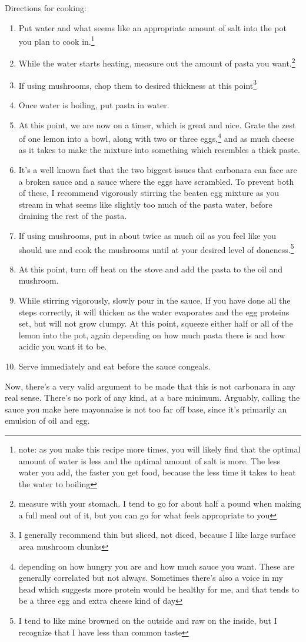 \documentclass[12pt]{article}[titlepage]
\newcommand{\1}{\={a}}
\newcommand{\2}{\={e}}
\newcommand{\3}{\={\i}}
\newcommand{\4}{\=o}
\newcommand{\5}{\=u}
\newcommand{\6}{\={A}}
\renewcommand{\,}{\textsuperscript{,}}
\begin{document}
Directions for cooking:
\begin{enumerate}
\item Put water and what seems like an appropriate amount of salt into the pot you plan to cook in.\footnote{note: as you make this recipe more times, you will likely find that the optimal amount of water is less and the optimal amount of salt is more.
The less water you add, the faster you get food, because the less time it takes to heat the water to boiling}
\item While the water starts heating, measure out the amount of pasta you want.\footnote{measure with your stomach.
I tend to go for about half a pound when making a full meal out of it, but you can go for what feels appropriate to you}
\item If using mushrooms, chop them to desired thickness at this point\footnote{I generally recommend thin but sliced, not diced, because I like large surface area mushroom chunks}
\item Once water is boiling, put pasta in water.
\item At this point, we are now on a timer, which is great and nice.
Grate the zest of one lemon into a bowl, along with two or three eggs,\footnote{depending on how hungry you are and how much sauce you want.
These are generally correlated but not always.
Sometimes there's also a voice in my head which suggests more protein would be healthy for me, and that tends to be a three egg and extra cheese kind of day}
and as much cheese as it takes to make the mixture into something which resembles a thick paste.
\item It's a well known fact that the two biggest issues that carbonara can face are a broken sauce and a sauce where the eggs have scrambled.
To prevent both of these, I recommend vigorously stirring the beaten egg mixture as you stream in what seems like slightly too much of the pasta water, before draining the rest of the pasta.
\item If using mushrooms, put in about twice as much oil as you feel like you should use and cook the mushrooms until at your desired level of doneness.\footnote{I tend to like mine browned on the outside and raw on the inside, but I recognize that I have less than common taste}
\item At this point, turn off heat on the stove and add the pasta to the oil and mushroom.
\item While stirring vigorously, slowly pour in the sauce.
If you have done all the steps correctly, it will thicken as the water evaporates and the egg proteins set, but will not grow clumpy.
At this point, squeeze either half or all of the lemon into the pot, again depending on how much pasta there is and how acidic you want it to be.
\item Serve immediately and eat before the sauce congeals.
\end{enumerate}
Now, there's a very valid argument to be made that this is not carbonara in any real sense.
There's no pork of any kind, at a bare minimum.
Arguably, calling the sauce you make here mayonnaise is not too far off base, since it's primarily an emulsion of oil and egg.
\end{document}
